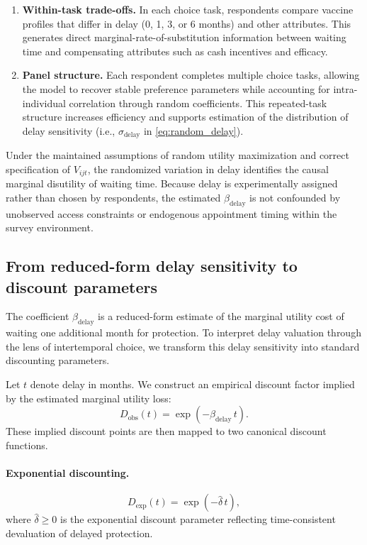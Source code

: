 \documentclass[doublespacing]{utdthesis}
\begin{document}
\begin{enumerate}
\item \textbf{Within-task trade-offs.} In each choice task, respondents compare vaccine profiles that differ in delay (0, 1, 3, or 6 months) and other attributes. This generates direct marginal-rate-of-substitution information between waiting time and compensating attributes such as cash incentives and efficacy.

\item \textbf{Panel structure.} Each respondent completes multiple choice tasks, allowing the model to recover stable preference parameters while accounting for intra-individual correlation through random coefficients. This repeated-task structure increases efficiency and supports estimation of the distribution of delay sensitivity (i.e., $\sigma_{\text{delay}}$ in \eqref{eq:random_delay}).
\end{enumerate}

Under the maintained assumptions of random utility maximization and correct specification of $V_{ijt}$, the randomized variation in delay identifies the causal marginal disutility of waiting time. Because delay is experimentally assigned rather than chosen by respondents, the estimated $\beta_{\text{delay}}$ is not confounded by unobserved access constraints or endogenous appointment timing within the survey environment.

\subsection*{From reduced-form delay sensitivity to discount parameters}

The coefficient $\beta_{\text{delay}}$ is a reduced-form estimate of the marginal utility cost of waiting one additional month for protection. To interpret delay valuation through the lens of intertemporal choice, we transform this delay sensitivity into standard discounting parameters.

Let $t$ denote delay in months. We construct an empirical discount factor implied by the estimated marginal utility loss:
\begin{equation}
D_{\text{obs}}(t)=\exp\!\left(-\beta_{\text{delay}}\, t\right).
\label{eq:Dobs}
\end{equation}
These implied discount points are then mapped to two canonical discount functions.

\paragraph{Exponential discounting.}
\begin{equation}
D_{\text{exp}}(t)=\exp\!\left(-\hat{\delta}\, t\right),
\label{eq:Dexp}
\end{equation}
where $\hat{\delta}\ge 0$ is the exponential discount parameter reflecting time-consistent devaluation of delayed protection.
\end{document}

